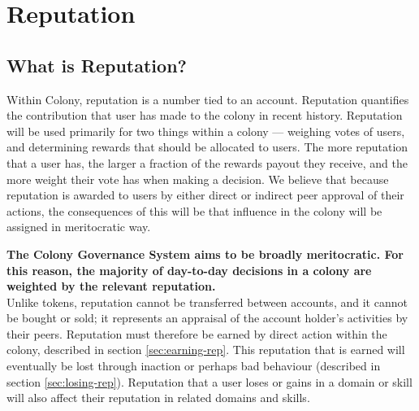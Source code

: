 \section{Reputation}\label{sec:reputation}
\subsection{What is Reputation?}\label{subsec:what-is-reputation}

Within Colony, reputation is a number tied to an account. Reputation quantifies the contribution that user has made to the colony in recent history. Reputation will be used primarily for two things within a colony --- weighing votes of users, and determining rewards that should be allocated to users. The more reputation that a user has, the larger a fraction of the rewards payout they receive, and the more weight their vote has when making a decision. We believe that because reputation is awarded to users by either direct or indirect peer approval of their actions, the consequences of this will be that influence in the colony will be assigned in meritocratic way.

\textbf{The Colony Governance System aims to be broadly meritocratic. For this reason, the majority of day-to-day decisions in a colony are weighted by the relevant reputation.}\\ %

Unlike tokens, reputation cannot be transferred between accounts, and it cannot be bought or sold; it represents an appraisal of the account holder's activities by their peers. Reputation must therefore be earned by direct action within the colony, described in section \ref{sec:earning-rep}. This reputation that is earned will eventually be lost through inaction or perhaps bad behaviour (described in section \ref{sec:losing-rep}). Reputation that a user loses or gains in a domain or skill will also affect their reputation in related domains and skills.



